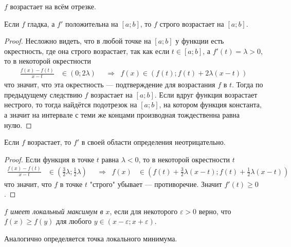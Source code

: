 \documentclass[12pt,a4paper]{article}
\begin{document}
    \begin{corollary}
        $f$ возрастает на всём отрезке.
    \end{corollary}

    \begin{theorem}
        Если $f$ гладка, а $f'$ положительна на $[a; b]$, то $f$ строго возрастает на $[a; b]$.
    \end{theorem}

    \begin{proof}
        Несложно видеть, что в любой точке на $[a; b]$ у функции есть окрестность, где она строго возрастает, так как если $t \in [a; b]$, а $f'(t) = \lambda > 0$, то в некоторой окрестности
        \begin{align*}
            \frac{f(x) - f(t)}{x - t} &\in (0; 2\lambda)&
            &\Longrightarrow&
            f(x) \in (f(t); f(t) + 2\lambda(x-t))
        \end{align*}
        что значит, что эта окрестность --- подтверждение для возрастания $f$ в $t$. Тогда по предыдущему следствию $f$ возрастает на $[a; b]$. Если вдруг функция возрастает нестрого, то тогда найдётся подотрезок на $[a;b]$, на котором функция константа, а значит на интервале с теми же концами производная тождественна равна нулю.
    \end{proof}

    \begin{theorem}
        Если $f$ возрастает, то $f'$ в своей области определения неотрицательно.
    \end{theorem}

    \begin{proof}
        Если функция в точке $t$ равна $\lambda < 0$, то в некоторой окрестности $t$
        \begin{align*}
            \frac{f(x)-f(t)}{x-t} &\in \left(\frac{3}{2}\lambda; \frac{1}{2}\lambda\right)&
            &\Longrightarrow&
            f(x) &\in \left(f(t) + \frac{3}{2}\lambda(x-t); f(t) + \frac{1}{2}\lambda(x-t)\right)
        \end{align*}
        что значит, что $f$ в точке $t$ "строго" убывает --- противоречие. Значит $f'(t) \geqslant 0$.
    \end{proof}

    \begin{definition}
        \emph{$f$ имеет локальный максимум в $x$}, если для некоторого $\varepsilon > 0$ верно, что $f(x) \geqslant f(y)$ для любого $y \in (x - \varepsilon; x + \varepsilon)$.

        Аналогично определяется точка локального минимума.
    \end{definition}
\end{document}
